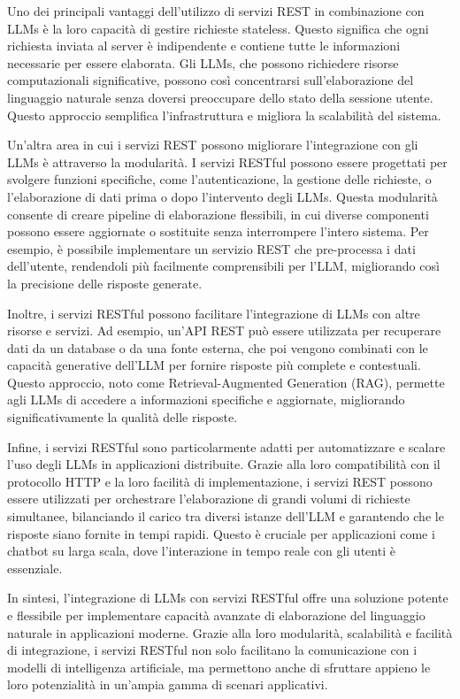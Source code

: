 \documentclass[a4paper,twoside,12pt]{toptesi}
\begin{document}
Uno dei principali vantaggi dell'utilizzo di servizi REST in combinazione con LLMs è la loro capacità di gestire richieste stateless. Questo significa che ogni richiesta inviata al server è indipendente e contiene tutte le informazioni necessarie per essere elaborata. Gli LLMs, che possono richiedere risorse computazionali significative, possono così concentrarsi sull'elaborazione del linguaggio naturale senza doversi preoccupare dello stato della sessione utente. Questo approccio semplifica l'infrastruttura e migliora la scalabilità del sistema.

Un'altra area in cui i servizi REST possono migliorare l'integrazione con gli LLMs è attraverso la modularità. I servizi RESTful possono essere progettati per svolgere funzioni specifiche, come l'autenticazione, la gestione delle richieste, o l'elaborazione di dati prima o dopo l'intervento degli LLMs. Questa modularità consente di creare pipeline di elaborazione flessibili, in cui diverse componenti possono essere aggiornate o sostituite senza interrompere l'intero sistema. Per esempio, è possibile implementare un servizio REST che pre-processa i dati dell'utente, rendendoli più facilmente comprensibili per l'LLM, migliorando così la precisione delle risposte generate.

Inoltre, i servizi RESTful possono facilitare l'integrazione di LLMs con altre risorse e servizi. Ad esempio, un'API REST può essere utilizzata per recuperare dati da un database o da una fonte esterna, che poi vengono combinati con le capacità generative dell'LLM per fornire risposte più complete e contestuali. Questo approccio, noto come Retrieval-Augmented Generation (RAG), permette agli LLMs di accedere a informazioni specifiche e aggiornate, migliorando significativamente la qualità delle risposte.

Infine, i servizi RESTful sono particolarmente adatti per automatizzare e scalare l'uso degli LLMs in applicazioni distribuite. Grazie alla loro compatibilità con il protocollo HTTP e la loro facilità di implementazione, i servizi REST possono essere utilizzati per orchestrare l'elaborazione di grandi volumi di richieste simultanee, bilanciando il carico tra diversi istanze dell'LLM e garantendo che le risposte siano fornite in tempi rapidi. Questo è cruciale per applicazioni come i chatbot su larga scala, dove l'interazione in tempo reale con gli utenti è essenziale.

In sintesi, l'integrazione di LLMs con servizi RESTful offre una soluzione potente e flessibile per implementare capacità avanzate di elaborazione del linguaggio naturale in applicazioni moderne. Grazie alla loro modularità, scalabilità e facilità di integrazione, i servizi RESTful non solo facilitano la comunicazione con i modelli di intelligenza artificiale, ma permettono anche di sfruttare appieno le loro potenzialità in un'ampia gamma di scenari applicativi.
\end{document}
